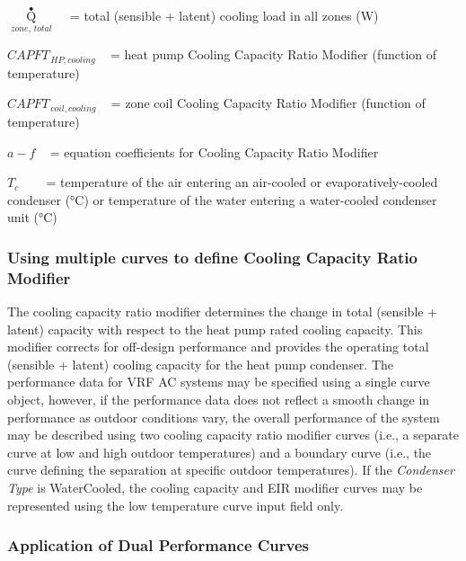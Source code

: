 \({\mathop Q\limits^ \bullet_{zone,\,total}}\) ~ = total (sensible + latent) cooling load in all zones (W)

\(CAPF{T_{\,HP,cooling}}\) ~ = heat pump Cooling Capacity Ratio Modifier (function of temperature)

\(CAPF{T_{\,coil,cooling}}\) ~ = zone coil Cooling Capacity Ratio Modifier (function of temperature)

\(a - f\) ~ = equation coefficients for Cooling Capacity Ratio Modifier

\({T_c}\) ~~~ = temperature of the air entering an air-cooled or evaporatively-cooled condenser (°C) or temperature of the water entering a water-cooled condenser unit (°C)

\subsubsection{Using multiple curves to define Cooling Capacity Ratio Modifier}\label{using-multiple-curves-to-define-cooling-capacity-ratio-modifier}

The cooling capacity ratio modifier determines the change in total (sensible + latent) capacity with respect to the heat pump rated cooling capacity. This modifier corrects for off-design performance and provides the operating total (sensible + latent) cooling capacity for the heat pump condenser. The performance data for VRF AC systems may be specified using a single curve object, however, if the performance data does not reflect a smooth change in performance as outdoor conditions vary, the overall performance of the system may be described using two cooling capacity ratio modifier curves (i.e., a separate curve at low and high outdoor temperatures) and a boundary curve (i.e., the curve defining the separation at specific outdoor temperatures). If the \textit{Condenser Type} is WaterCooled, the cooling capacity and EIR modifier curves may be represented using the low temperature curve input field only. 

\subsubsection{Application of Dual Performance Curves}\label{application-of-dual-performance-curves}

